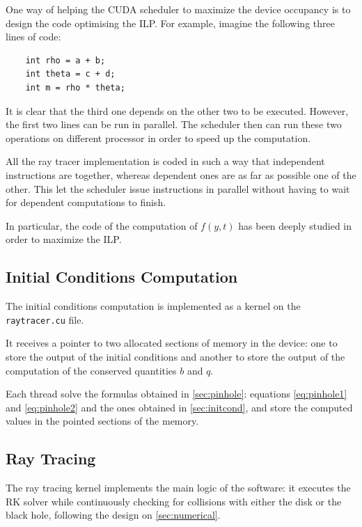 One way of helping the \ac{CUDA} scheduler to maximize the device occupancy is to design the code optimising the \ac{ILP}. For example, imagine the following three lines of code:

\begin{lstlisting}
	int rho = a + b;
	int theta = c + d;
	int m = rho * theta;
\end{lstlisting}

It is clear that the third one depends on the other two to be executed. However, the first two lines can be run in parallel. The scheduler then can run these two operations on different processor in order to speed up the computation.

All the ray tracer implementation is coded in such a way that independent instructions are together, whereas dependent ones are as far as possible one of the other. This let the scheduler issue instructions in parallel without having to wait for dependent computations to finish.

In particular, the code of the computation of $f(y,t)$ has been deeply studied in order to maximize the \ac{ILP}.

\subsection{Initial Conditions Computation}

The initial conditions computation is implemented as a kernel on the \lstinline{raytracer.cu} file.

It receives a pointer to two allocated sections of memory in the device: one to store the output of the initial conditions and another to store the output of the computation of the conserved quantities $b$ and $q$.

Each thread solve the formulas obtained in \autoref{sec:pinhole}: equations \ref{eq:pinhole1} and \ref{eq:pinhole2} and the ones obtained in \autoref{sec:initcond}, and store the computed values in the pointed sections of the memory.

\subsection{Ray Tracing}

The ray tracing kernel implements the main logic of the software: it executes the \ac{RK} solver while continuously checking for collisions with either the disk or the black hole, following the design on \autoref{sec:numerical}.

